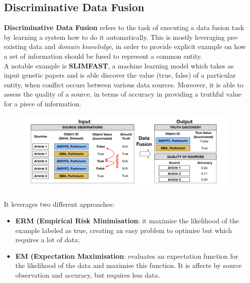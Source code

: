 \documentclass[10pt,a4paper]{article}
\begin{document}
\begin{justify}
\subsection{Discriminative Data Fusion}
\textbf{Discriminative Data Fusion} refers to the task of executing a data fusion task by learning a system how to do it automatically. This is mostly leveraging pre-existing data and \textit{domain knowledge}, in order to provide explicit example on how a set of information should be fused to represent a common entity.\\
A notable example is \textbf{SLIMFAST}, a machine learning model which takes as input genetic papers and is able discover the value (true, false) of a particular entity, when conflict occurs between various data sources. Moreover, it is able to assess the quality of a source, in terms of accuracy in providing a truthful value for a piece of information.
\begin{figure}[htp]
\centering
\includegraphics[width=1\textwidth]{images/SLIMFAST.png}\hfill
\end{figure}
It leverages two different approaches:
\begin{itemize}
    \item \textbf{ERM (Empirical Risk Minimisation}: it maximise the likelihood of the example labeled as true, creating an easy problem to optimise but which requires a lot of data;
    \item \textbf{EM (Expectation Maximisation}: evaluates an expectation function for the likelihood of the data and maximise this function. It is affecte by source observation and accuracy, but requires less data.
\end{itemize}

\end{justify}
\end{document}
